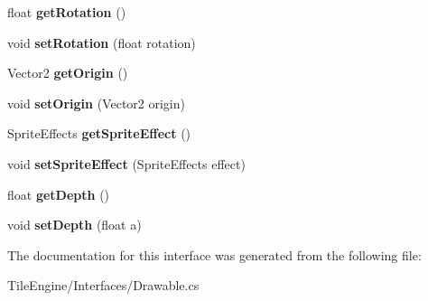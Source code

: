 \begin{DoxyCompactItemize}
\item 
\hypertarget{interface_tile_engine_1_1_interfaces_1_1_drawable_a529a9fdf66059e6fd7b0667b24606677}{float {\bfseries get\-Rotation} ()}\label{df/d03/interface_tile_engine_1_1_interfaces_1_1_drawable_a529a9fdf66059e6fd7b0667b24606677}

\item 
\hypertarget{interface_tile_engine_1_1_interfaces_1_1_drawable_ae6e1519894803f06962fe18dc8ce9eb1}{void {\bfseries set\-Rotation} (float rotation)}\label{df/d03/interface_tile_engine_1_1_interfaces_1_1_drawable_ae6e1519894803f06962fe18dc8ce9eb1}

\item 
\hypertarget{interface_tile_engine_1_1_interfaces_1_1_drawable_a7a2b78c94c78d691b33111a145478095}{Vector2 {\bfseries get\-Origin} ()}\label{df/d03/interface_tile_engine_1_1_interfaces_1_1_drawable_a7a2b78c94c78d691b33111a145478095}

\item 
\hypertarget{interface_tile_engine_1_1_interfaces_1_1_drawable_a21ccc11a9d8bcc95114e1d015bcacc9a}{void {\bfseries set\-Origin} (Vector2 origin)}\label{df/d03/interface_tile_engine_1_1_interfaces_1_1_drawable_a21ccc11a9d8bcc95114e1d015bcacc9a}

\item 
\hypertarget{interface_tile_engine_1_1_interfaces_1_1_drawable_aee9136fe00cfa3e331af37f2992ea544}{Sprite\-Effects {\bfseries get\-Sprite\-Effect} ()}\label{df/d03/interface_tile_engine_1_1_interfaces_1_1_drawable_aee9136fe00cfa3e331af37f2992ea544}

\item 
\hypertarget{interface_tile_engine_1_1_interfaces_1_1_drawable_a491bf435b14ebb55027988c79cb661cf}{void {\bfseries set\-Sprite\-Effect} (Sprite\-Effects effect)}\label{df/d03/interface_tile_engine_1_1_interfaces_1_1_drawable_a491bf435b14ebb55027988c79cb661cf}

\item 
\hypertarget{interface_tile_engine_1_1_interfaces_1_1_drawable_a59e47795fcca97cb79dc15a6945d9275}{float {\bfseries get\-Depth} ()}\label{df/d03/interface_tile_engine_1_1_interfaces_1_1_drawable_a59e47795fcca97cb79dc15a6945d9275}

\item 
\hypertarget{interface_tile_engine_1_1_interfaces_1_1_drawable_ade7e95cd5f7f1d3afce9f0a63c89a052}{void {\bfseries set\-Depth} (float a)}\label{df/d03/interface_tile_engine_1_1_interfaces_1_1_drawable_ade7e95cd5f7f1d3afce9f0a63c89a052}

\end{DoxyCompactItemize}


The documentation for this interface was generated from the following file\-:\begin{DoxyCompactItemize}
\item 
Tile\-Engine/\-Interfaces/Drawable.\-cs\end{DoxyCompactItemize}

